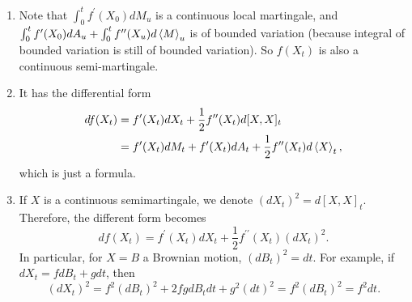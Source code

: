 \begin{rmk}
    \begin{enumerate}[label=(\roman*)]
        \item Note that $\int_0^t f^\prime(X_0) dM_u$ is a continuous local martingale, and $\int_0^t f^\prime(X_0) dA_u + \int_0^t f^{\prime\prime}(X_u)d\left\langle M \right\rangle_u$ is of bounded variation (because integral of bounded variation is still of bounded variation). So $f(X_t)$ is also a continuous semi-martingale. 
        \item It has the differential form
        \begin{align*}
            df(X_t) &= f^\prime(X_t)dX_t + \frac{1}{2}f^{\prime\prime}(X_t)d[X,X]_t\\
            &= f^\prime(X_t) dM_t + f^\prime(X_t)dA_t +\frac{1}{2}f^{\prime\prime}(X_t)d\left\langle X \right\rangle_t,
        \end{align*}
        which is just a formula.
        \item If $X$ is a continuous semimartingale, we denote $(dX_t)^2 = d [X,X]_t$. Therefore, the different form becomes
        \begin{equation*}
            df(X_t) = f^\prime(X_t)dX_t + \frac{1}{2}f^{\prime\prime}(X_t)(dX_t)^2.
        \end{equation*}
        In particular, for $X=B$ a Brownian motion, $(dB_t)^2 = dt$. For example, if $dX_t = fdB_t + g dt$, then
        \begin{equation*}
            (dX_t)^2 = f^2(dB_t)^2 + 2fg dB_t dt + g^2(dt)^2 = f^2 (dB_t)^2 = f^2 dt.
        \end{equation*}
    \end{enumerate}
\end{rmk}

